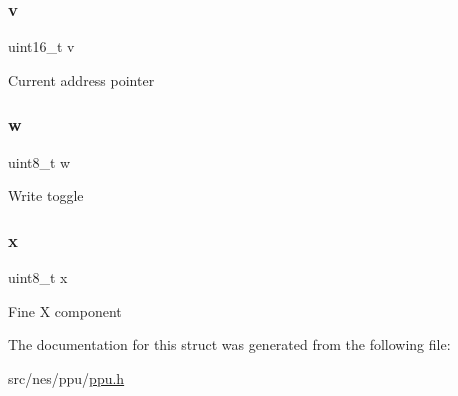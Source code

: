 \subsubsection{\texorpdfstring{v}{v}}
{\footnotesize\ttfamily uint16\+\_\+t v}

Current address pointer \mbox{\label{struct_v_r_a_m_aba9ed0487b0aa23eba534648df8384c0}} 
\subsubsection{\texorpdfstring{w}{w}}
{\footnotesize\ttfamily uint8\+\_\+t w}

Write toggle \mbox{\label{struct_v_r_a_m_a0f561e77fa0f040b637f4e04f6cd8078}} 
\subsubsection{\texorpdfstring{x}{x}}
{\footnotesize\ttfamily uint8\+\_\+t x}

Fine X component 

The documentation for this struct was generated from the following file\+:\begin{DoxyCompactItemize}
\item 
src/nes/ppu/\hyperlink{ppu_8h}{ppu.\+h}\end{DoxyCompactItemize}
